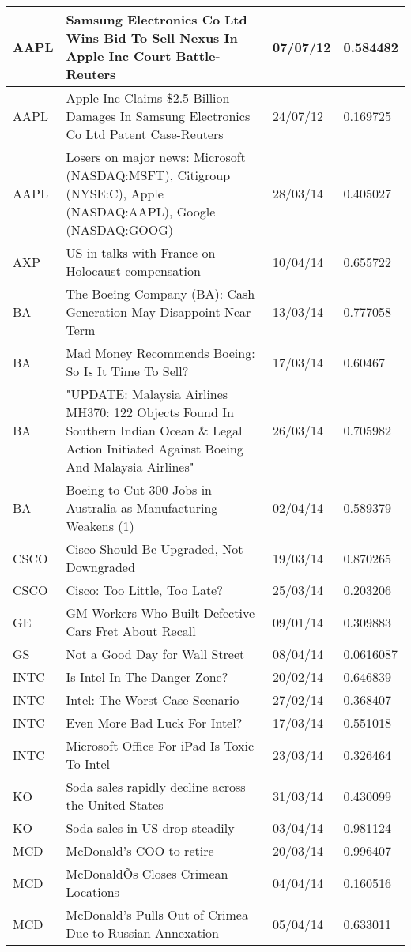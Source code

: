 \begin{table}
\begin{tabular}{ | p{1.1cm\textwidth} | p{8cm\textwidth} | p{1.5cm\textwidth} | p{1.5cm\textwidth} |}
AAPL&Samsung Electronics Co Ltd Wins Bid To Sell Nexus In Apple Inc Court Battle-Reuters&07/07/12&0.584482 \\ \hline
AAPL&Apple Inc Claims \$2.5 Billion Damages In Samsung Electronics Co Ltd Patent Case-Reuters&24/07/12&0.169725 \\ \hline
AAPL&Losers on major news: Microsoft (NASDAQ:MSFT), Citigroup (NYSE:C), Apple (NASDAQ:AAPL), Google (NASDAQ:GOOG)&28/03/14&0.405027 \\ \hline
AXP&US in talks with France on Holocaust compensation&10/04/14&0.655722 \\ \hline
BA&The Boeing Company (BA): Cash Generation May Disappoint Near-Term&13/03/14&0.777058 \\ \hline
BA&Mad Money Recommends Boeing: So Is It Time To Sell?&17/03/14&0.60467 \\ \hline
BA&"UPDATE: Malaysia Airlines MH370: 122 Objects Found In Southern Indian Ocean \& Legal Action Initiated Against Boeing And Malaysia Airlines"&26/03/14&0.705982 \\ \hline
BA&Boeing to Cut 300 Jobs in Australia as Manufacturing Weakens (1)&02/04/14&0.589379 \\ \hline
CSCO&Cisco Should Be Upgraded, Not Downgraded&19/03/14&0.870265 \\ \hline
CSCO&Cisco: Too Little, Too Late?&25/03/14&0.203206 \\ \hline
GE&GM Workers Who Built Defective Cars Fret About Recall&09/01/14&0.309883 \\ \hline
GS&Not a Good Day for Wall Street&08/04/14&0.0616087 \\ \hline
INTC&Is Intel In The Danger Zone?&20/02/14&0.646839 \\ \hline
INTC&Intel: The Worst-Case Scenario&27/02/14&0.368407 \\ \hline
INTC&Even More Bad Luck For Intel?&17/03/14&0.551018 \\ \hline
INTC&Microsoft Office For iPad Is Toxic To Intel&23/03/14&0.326464 \\ \hline
KO&Soda sales rapidly decline across the United States&31/03/14&0.430099 \\ \hline
KO&Soda sales in US drop steadily&03/04/14&0.981124 \\ \hline
MCD&McDonald's COO to retire&20/03/14&0.996407 \\ \hline
MCD&McDonaldÕs Closes Crimean Locations&04/04/14&0.160516 \\ \hline
MCD&McDonald's Pulls Out of Crimea Due to Russian Annexation&05/04/14&0.633011 \\ \hline
    \end{tabular}
\end{table}

